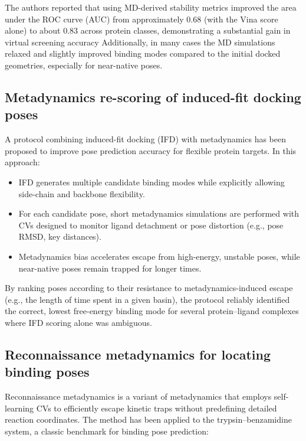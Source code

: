 \documentclass[12pt]{article}
\begin{document}
The authors reported\cite{CH9_guterres2020} that using MD-derived stability metrics improved the area under the ROC curve (AUC) from approximately 0.68 (with the Vina score alone) to about 0.83 across protein classes, demonstrating a substantial gain in virtual screening accuracy Additionally, in many cases the MD simulations relaxed and slightly improved binding modes compared to the initial docked geometries, especially for near-native poses.

\subsection{Metadynamics re-scoring of induced-fit docking poses}

A protocol combining induced-fit docking (IFD) with metadynamics has been proposed to improve pose prediction accuracy for flexible protein targets\cite{CH9_clark2016}. In this approach:

\begin{itemize}
\item IFD generates multiple candidate binding modes while explicitly allowing side-chain and backbone flexibility.
\item For each candidate pose, short metadynamics simulations are performed with CVs designed to monitor ligand detachment or pose distortion (e.g., pose RMSD, key distances).
\item Metadynamics bias accelerates escape from high-energy, unstable poses, while near-native poses remain trapped for longer times.
\end{itemize}

By ranking poses according to their resistance to metadynamics-induced escape (e.g., the length of time spent in a given basin), the protocol reliably identified the correct, lowest free-energy binding mode for several protein--ligand complexes where IFD scoring alone was ambiguous\cite{CH9_clark2016}.

\subsection{Reconnaissance metadynamics for locating binding poses}

Reconnaissance metadynamics\cite{CH9_soderhjelm2012} is a variant of metadynamics that employs self-learning CVs to efficiently escape kinetic traps without predefining detailed reaction coordinates. The method has been applied to the trypsin--benzamidine system, a classic benchmark for binding pose prediction:
\end{document}
